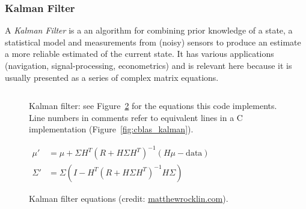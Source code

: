 \subsubsection{Kalman Filter}

A \emph{Kalman Filter}\cite{kalman} is a an algorithm for combining prior
knowledge of a state, a statistical model and measurements from (noisy) sensors
to produce an estimate a more reliable estimated of the current state.  It has
various applications (navigation, signal-processing, econometrics) and is
relevant here because it is usually presented as a series of complex matrix
equations.

\begin{figure}[t]
    \centering
    \inputminted[fontsize=\small]{ocaml}{../../test/examples/kalman.lt}
    \caption{Kalman filter: see Figure~\ref{fig:kalman_eqns} for the
        equations this code implements. Line numbers in comments refer to
        equivalent lines in a C implementation
        (Figure~\ref{fig:cblas_kalman}).}\label{fig:lang_kalman}
\end{figure}

\begin{figure}[t]
    {\centering
    $  \displaystyle
    \begin{aligned}
        \mu' &= \mu + \Sigma H^T (R + H \Sigma H^T)^{-1} (H \mu - \textrm{data})\\
        \Sigma' &= \Sigma ( I - H^T (R + H \Sigma H^T)^{-1} H \Sigma )
    \end{aligned}
    $ \par}
    \caption{Kalman filter equations (credit:
    \href{http://matthewrocklin.com/blog/work/2012/11/24/Kalman-Filter}{matthewrocklin.com}).}\label{fig:kalman_eqns}
\end{figure}

